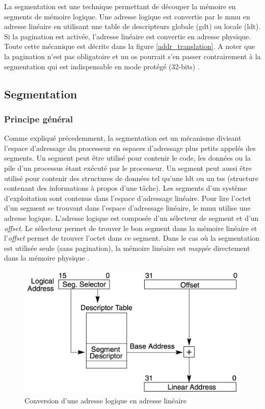 La segmentation est une technique permettant de découper la mémoire en segments
de mémoire logique. Une adresse logique est convertie par le \acrshort{mmu} en
adresse linéaire en utilisant une table de descripteurs globale (\acrshort{gdt})
ou locale (\acrshort{ldt}). Si la pagination est activée, l'adresse linéaire est
convertie en adresse physique. Toute cette mécanique est décrite dans la figure
\ref{addr_translation}. A noter que la pagination n'est pas obligatoire et un
\acrshort{os} pourrait s'en passer contrairement à la segmentation qui est
indispensable en mode protégé (32-bits) \cite{ref17}.


\subsection{Segmentation}
\subsubsection{Principe général}
Comme expliqué précedemment, la segmentation est un mécanisme divisant l'espace
d'adressage du processeur en espaces d'adressage plus petits appelés des
segments. Un segment peut être utilisé pour contenir le code, les données ou la
pile d'un processus étant exécuté par le processeur. Un segment peut aussi être
utilisé pour contenir des structures de données tel qu'une \acrshort{ldt} ou
un \acrshort{tss} (structure contenant des informations à propos d'une tâche).
Les segments d'un système d'exploitation sont contenus dans l'espace d'adressage
linéaire. Pour lire l'octet d'un segment se trouvant dans l'espace d'adressage
linéaire, le \acrshort{mmu} utilise une adresse logique. L'adresse logique est
composée d'un sélecteur de segment et d'un \textit{offset}. Le sélecteur permet
de trouver le bon segment dans la mémoire linéaire et l'\textit{offset} permet
de trouver l'octet dans ce segment. Dans le cas où la segmentation est utilisée
seule (sans pagination), la mémoire linéaire est \textit{mappée} directement dans
la mémoire physique \cite{ref66}. \\

\begin{figure}[!h]
  \centering
  \includegraphics[scale=0.43]{images/logic_addr_conv.png}
  \caption{Conversion d'une adresse logique en adresse linéaire}
  \label{logic_addr_conv}
\end{figure}


